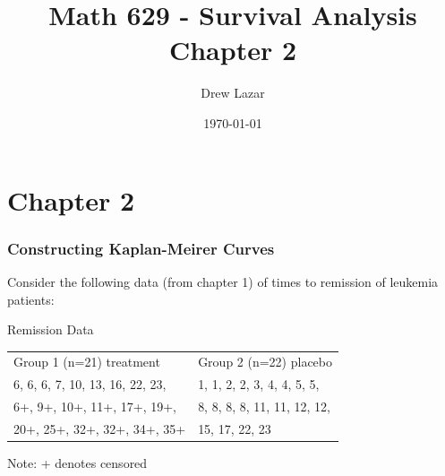\documentclass{beamer}
\title{Math 629 - Survival Analysis \\ Chapter 2}
\author{Drew Lazar}
\institute{Ball State University}
\date{\today}
\theoremstyle{definition}
\begin{document}
\begin{frame}
    \titlepage
\end{frame}
\section{Chapter 2}

\begin{frame}
\frametitle{Constructing Kaplan-Meirer Curves}
Consider the following data (from chapter 1) of times to remission of leukemia patients:
\begin{block}{Remission Data }
\begin{table}
\begin{center}
\begin{tabular}{l l}
Group 1 (n=21) treatment & Group 2 (n=22) placebo \\
 6, 6, 6, 7, 10, 13, 16, 22, 23, & 1, 1, 2, 2, 3, 4, 4, 5, 5,  \\
 6+, 9+, 10+, 11+, 17+, 19+, & 8, 8, 8, 8, 11, 11, 12, 12, \\
   20+, 25+, 32+, 32+, 34+, 35+ & 15, 17, 22, 23
\end{tabular}
\end{center}
\end{table}
Note: + denotes censored
\end{block}
\end{frame}
\end{document}
